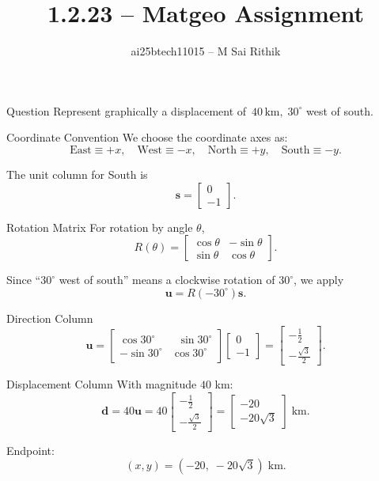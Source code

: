 \documentclass{beamer}
\title{1.2.23 -- Matgeo Assignment}
\author{ai25btech11015 -- M Sai Rithik}
\date{}
\begin{document}
\frame{\titlepage}

\begin{frame}{Question}
Represent graphically a displacement of \(\,40\,\text{km},\;30^\circ\) west of south.
\end{frame}

\begin{frame}{Coordinate Convention}
We choose the coordinate axes as:
\[
\text{East} \equiv +x,\quad
\text{West} \equiv -x,\quad
\text{North} \equiv +y,\quad
\text{South} \equiv -y.
\]

The unit column for South is
\[
\mathbf{s} = 
\begin{bmatrix}
0 \\ -1
\end{bmatrix}.
\]
\end{frame}

\begin{frame}{Rotation Matrix}
For rotation by angle \(\theta\),
\[
R(\theta) =
\begin{bmatrix}
\cos\theta & -\sin\theta\\
\sin\theta & \cos\theta
\end{bmatrix}.
\]

Since “\(30^\circ\) west of south” means a clockwise rotation of \(30^\circ\), we apply
\[
\mathbf{u} = R(-30^\circ)\mathbf{s}.
\]
\end{frame}

\begin{frame}{Direction Column}
\[
\mathbf{u} =
\begin{bmatrix}
\cos 30^\circ & \;\;\sin 30^\circ \\
-\sin 30^\circ & \cos 30^\circ
\end{bmatrix}
\begin{bmatrix}
0 \\ -1
\end{bmatrix}
=
\begin{bmatrix}
-\tfrac{1}{2}\\[4pt]
-\tfrac{\sqrt{3}}{2}
\end{bmatrix}.
\]
\end{frame}

\begin{frame}{Displacement Column}
With magnitude \(40\) km:
\[
\mathbf{d} = 40\mathbf{u}
= 40
\begin{bmatrix}
-\tfrac{1}{2}\\[2pt]
-\tfrac{\sqrt{3}}{2}
\end{bmatrix}
=
\begin{bmatrix}
-20\\[2pt]
-20\sqrt{3}
\end{bmatrix}\;\text{km}.
\]

Endpoint:
\[
(x,y) = (-20,\; -20\sqrt{3}) \;\text{km}.
\]
\end{frame}
\end{document}
